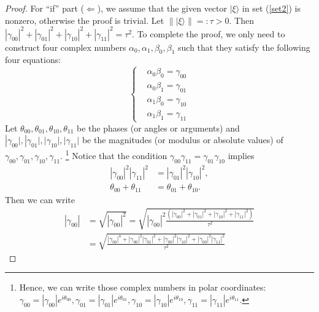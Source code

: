 \begin{example}
\begin{proof}
        For ``if'' part ($\Longleftarrow$), we assume that the given vector $|\xi\rangle$ in set (\ref{set2}) is nonzero, otherwise the proof is trivial. Let $\| |\xi\rangle \| =: \tau >0$. Then $\left|\gamma_{00}\right|^2+\left|\gamma_{01}\right|^2+\left|\gamma_{10}\right|^2+\left|\gamma_{11}\right|^2 = \tau^2.$
        To complete the proof, we only need to construct four complex numbers $\alpha_0, \alpha_1, \beta_0, \beta_1$ such that they satisfy the following four equations:
        \begin{equation}
            \left\{
            \begin{aligned}
            & \alpha_0 \beta_0=\gamma_{00} \\
            & \alpha_0 \beta_1=\gamma_{01} \\
            & \alpha_1 \beta_0=\gamma_{10} \\
            & \alpha_1 \beta_1=\gamma_{11}
            \end{aligned}
            \right.
    \end{equation}
    Let $\theta_{00}, \theta_{01}, \theta_{10}, \theta_{11}$ be the phases (or angles or arguments) and $\left|\gamma_{00}|,\right| \gamma_{01}|,| \gamma_{10}|,| \gamma_{11} |$ be the magnitudes (or modulus or absolute values) of $\gamma_{00}, \gamma_{01}, \gamma_{10}, \gamma_{11}$.
    \footnote{Hence, we can write those complex numbers in polar coordinates:
	$
	\gamma_{00}=\left|\gamma_{00}\right| e^{i \theta_{00}}, \gamma_{01}=\left|\gamma_{01}\right| e^{i \theta_{01}}, \gamma_{10}=\left|\gamma_{10}\right| e^{i \theta_{10}}, \gamma_{11}=\left|\gamma_{11}\right| e^{i \theta_{11}}.
	$}
    Notice that the condition $\gamma_{00} \gamma_{11}=\gamma_{01} \gamma_{10}$ implies
    \begin{align}
    \left|\gamma_{00}\right|^2\left|\gamma_{11}\right|^2 & =\left|\gamma_{01}\right|^2\left|\gamma_{10}\right|^2, \label{eq17} \\
    \theta_{00}+\theta_{11} & =\theta_{01}+\theta_{10}. \label{eq18} 
    \end{align}
    Then we can write 
    \begin{equation}
    \begin{aligned}
    \left|\gamma_{00}\right| & =\sqrt{\left|\gamma_{00}\right|^2}
    =\sqrt{
    \left|\gamma_{00}\right|^2
    \frac{\left(\left|\gamma_{00}\right|^2+\left|\gamma_{01}\right|^2+\left|\gamma_{10}\right|^2+\left|\gamma_{11}\right|^2\right)}{\tau^2}
    }
    \\
    & =\sqrt{
    \frac{\left|\gamma_{00}\right|^4+\left|\gamma_{00}\right|^2\left|\gamma_{01}\right|^2+\left|\gamma_{00}\right|^2\left|\gamma_{10}\right|^2+\left|\gamma_{00}\right|^2\left|\gamma_{11}\right|^2}{\tau^2}
}
\end{aligned}
\end{equation}
\end{proof}
\end{example}
